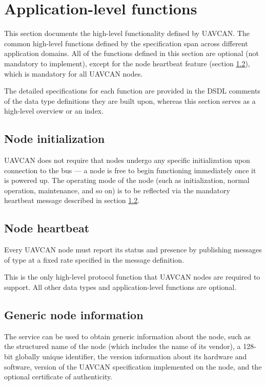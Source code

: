 \section{Application-level functions}\label{sec:application_level_functions}

This section documents the high-level functionality defined by UAVCAN.
The common high-level functions defined by the specification span across different application domains.
All of the functions defined in this section are optional (not mandatory to implement),
except for the node heartbeat feature (section \ref{sec:application_node_heartbeat}),
which is mandatory for all UAVCAN nodes.

The detailed specifications for each function are provided in the DSDL comments of the data type definitions
they are built upon, whereas this section serves as a high-level overview or an index.

\subsection{Node initialization}

UAVCAN does not require that nodes undergo any specific initialization upon connection to the bus ---
a node is free to begin functioning immediately once it is powered up.
The operating mode of the node (such as initialization, normal operation, maintenance, and so on)
is to be reflected via the mandatory heartbeat message described in section \ref{sec:application_node_heartbeat}.

\subsection{Node heartbeat}\label{sec:application_node_heartbeat}

Every UAVCAN node must report its status and presence by publishing messages of type
 at a fixed rate specified in the message definition.

This is the only high-level protocol function that UAVCAN nodes are required to support.
All other data types and application-level functions are optional.


\subsection{Generic node information}

The service  can be used to obtain generic information about the node,
such as the structured name of the node (which includes the name of its vendor),
a 128-bit globally unique identifier, the version information about its hardware and software,
version of the UAVCAN specification implemented on the node, and the optional certificate of authenticity.

